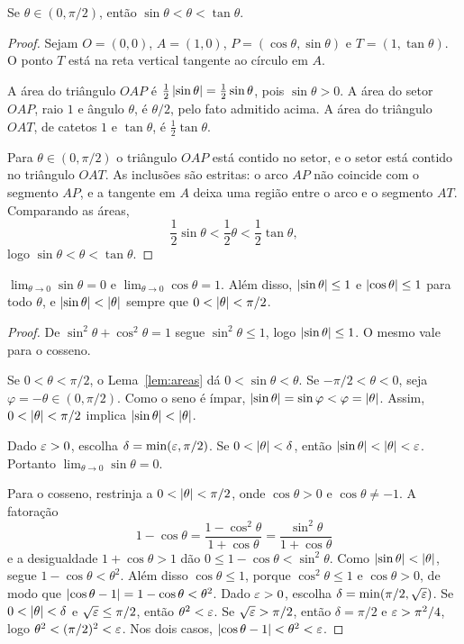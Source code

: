 \documentclass[11pt,a4paper]{article}
\begin{document}
\begin{lema}
\label{lem:areas}
Se $\theta\in(0,\pi/2)$, ent\~ao $\sin\theta<\theta<\tan\theta$.
\end{lema}

\begin{proof}
Sejam $O=(0,0)$, $A=(1,0)$, $P=(\cos\theta,\sin\theta)$ e $T=(1,\tan\theta)$. O ponto $T$ est\'a na reta vertical tangente ao c\'irculo em $A$.

A \'area do tri\^angulo $OAP$ \'e $\tfrac12\left\lvert \sin\theta \right\rvert=\tfrac12\sin\theta$, pois $\sin\theta>0$. A \'area do setor $OAP$, raio $1$ e \^angulo $\theta$, \'e $\theta/2$, pelo fato admitido acima. A \'area do tri\^angulo $OAT$, de catetos $1$ e $\tan\theta$, \'e $\tfrac12\tan\theta$.

Para $\theta\in(0,\pi/2)$ o tri\^angulo $OAP$ est\'a contido no setor, e o setor est\'a contido no tri\^angulo $OAT$. As inclus\~oes s\~ao estritas: o arco $AP$ n\~ao coincide com o segmento $AP$, e a tangente em $A$ deixa uma regi\~ao entre o arco e o segmento $AT$. Comparando as \'areas,
\[
\frac12\sin\theta<\frac12\theta<\frac12\tan\theta,
\]
logo $\sin\theta<\theta<\tan\theta$.
\end{proof}

\begin{lema}
\label{lem:sen-zero}
$\lim_{\theta\to 0}\sin\theta=0$ e $\lim_{\theta\to 0}\cos\theta=1$. Al\'em disso, $\left\lvert \sin\theta \right\rvert\le 1$ e $\left\lvert \cos\theta \right\rvert\le 1$ para todo $\theta$, e $\left\lvert \sin\theta \right\rvert<\left\lvert \theta \right\rvert$ sempre que $0<\left\lvert \theta \right\rvert<\pi/2$.
\end{lema}

\begin{proof}
De $\sin^2\theta+\cos^2\theta=1$ segue $\sin^2\theta\le 1$, logo $\left\lvert \sin\theta \right\rvert\le 1$. O mesmo vale para o cosseno.

Se $0<\theta<\pi/2$, o Lema~\ref{lem:areas} d\'a $0<\sin\theta<\theta$. Se $-\pi/2<\theta<0$, seja $\varphi=-\theta\in(0,\pi/2)$. Como o seno \'e \'impar, $\left\lvert \sin\theta \right\rvert=\sin\varphi<\varphi=\left\lvert \theta \right\rvert$. Assim, $0<\left\lvert \theta \right\rvert<\pi/2$ implica $\left\lvert \sin\theta \right\rvert<\left\lvert \theta \right\rvert$.

Dado $\varepsilon>0$, escolha $\delta=\min(\varepsilon,\pi/2)$. Se $0<\left\lvert \theta \right\rvert<\delta$, ent\~ao $\left\lvert \sin\theta \right\rvert<\left\lvert \theta \right\rvert<\varepsilon$. Portanto $\lim_{\theta\to 0}\sin\theta=0$.

Para o cosseno, restrinja a $0<\left\lvert \theta \right\rvert<\pi/2$, onde $\cos\theta>0$ e $\cos\theta\neq -1$. A fatora\c{c}\~ao
\[
1-\cos\theta=\frac{1-\cos^2\theta}{1+\cos\theta}=\frac{\sin^2\theta}{1+\cos\theta}
\]
e a desigualdade $1+\cos\theta>1$ d\~ao $0\le 1-\cos\theta<\sin^2\theta$. Como $\left\lvert \sin\theta \right\rvert<\left\lvert \theta \right\rvert$, segue $1-\cos\theta<\theta^2$. Al\'em disso $\cos\theta\le 1$, porque $\cos^2\theta\le 1$ e $\cos\theta>0$, de modo que $\left\lvert \cos\theta-1 \right\rvert=1-\cos\theta<\theta^2$. Dado $\varepsilon>0$, escolha $\delta=\min(\pi/2,\sqrt{\varepsilon})$. Se $0<\left\lvert \theta \right\rvert<\delta$ e $\sqrt{\varepsilon}\le \pi/2$, ent\~ao $\theta^2<\varepsilon$. Se $\sqrt{\varepsilon}>\pi/2$, ent\~ao $\delta=\pi/2$ e $\varepsilon>\pi^2/4$, logo $\theta^2<(\pi/2)^2<\varepsilon$. Nos dois casos, $\left\lvert \cos\theta-1 \right\rvert<\theta^2<\varepsilon$.
\end{proof}
\end{document}
